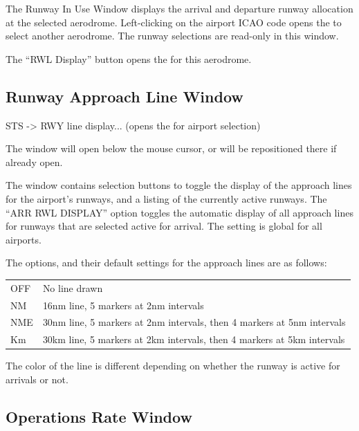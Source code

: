 \documentclass[a4paper,oneside,11pt]{memoir}
\begin{document}

The Runway In Use Window displays the arrival and departure runway allocation at the selected aerodrome. Left-clicking on the airport ICAO code opens the  to select another aerodrome. The runway selections are read-only in this window.

\bigskip

The “RWL Display” button opens the  for this aerodrome.

\subsection{Runway Approach Line Window}\label{win:ralw}

 STS -> RWY line display... (opens the  for airport selection)


The window will open below the mouse cursor, or will be repositioned there if already open. 

\bigskip

The window contains selection buttons to toggle the display of the approach lines for the airport’s runways, and a listing of the currently active runways. The “ARR RWL DISPLAY” option toggles the automatic display of all approach lines for runways that are selected active for arrival. The setting is global for all airports.

\bigskip

The options, and their default settings for the approach lines are as follows:

\begin{longtable}{p{2.5cm} p{10cm}}
  OFF & No line drawn\\
  NM  & 16nm line, 5 markers at 2nm intervals\\
  NME & 30nm line, 5 markers at 2nm intervals, then 4 markers at 5nm intervals\\
  Km  & 30km line, 5 markers at 2km intervals, then 4 markers at 5km intervals\\
\end{longtable}

The color of the line is different depending on whether the runway is active for arrivals or not.

\subsection{Operations Rate Window}
\label{win:orw}
\end{document}
